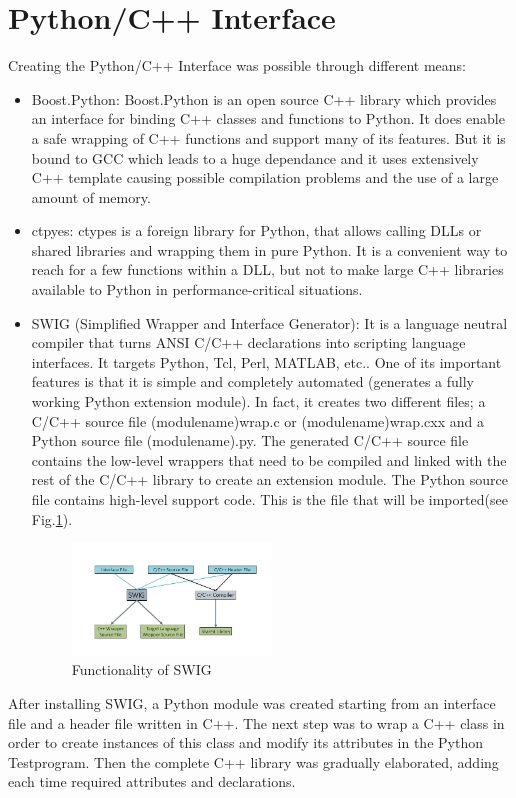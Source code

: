 \section{Python/C++ Interface}
Creating the Python/C++ Interface was possible through different means:\\
\begin{itemize}
\item Boost.Python: Boost.Python is an open source C++ library which provides an interface for binding C++ classes and functions to Python. It does enable a safe wrapping of C++ functions and support many of its features. But it is bound to GCC which leads to a huge dependance and it uses extensively C++ template causing possible compilation problems and the use of a large amount of memory. \\
\item ctpyes: ctypes is a foreign library for Python, that allows calling DLLs or shared libraries and wrapping them in pure Python. It is a convenient way to reach for a few functions within a DLL, but not to make large C++ libraries available to Python in performance-critical situations.\\
\item SWIG (Simplified Wrapper and Interface Generator): It is a language neutral compiler that turns ANSI C/C++ declarations into scripting language interfaces. It targets Python, Tcl, Perl, MATLAB, etc.. One of its important features is that it is simple and completely automated (generates a fully working Python extension module). In fact, it creates two different files; a C/C++ source file (module\textunderscore name)\textunderscore wrap.c or (module\textunderscore name)\textunderscore wrap.cxx and a Python source file (module\textunderscore name).py. The generated C/C++ source file contains the low-level wrappers that need to be compiled and linked with the rest of the C/C++ library to create an extension module. The Python source file contains high-level support code. This is the file that will be imported(see Fig.\ref{fig:swig}).\\
\begin{figure}[htb]
  \centering
  \includegraphics[width=0.5\textwidth]{figures/swig_func}
  \caption{Functionality of SWIG}
  \label{fig:swig}
\end{figure}
\end{itemize}
After installing SWIG, a Python module was created starting from an interface file and a header file written in C++. The next step was to wrap a C++ class in order to create instances of this class and modify its attributes in the Python Testprogram. Then the complete C++ library was gradually elaborated, adding each time required attributes and declarations.\\
